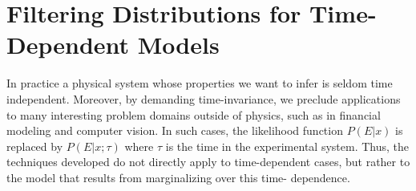 \documentclass[aps,amsmath,onecolumn,amssymb]{revtex4}
\begin{document}


\section{Filtering Distributions for Time-Dependent Models}
\label{sec:time-dep}

In practice a physical system whose properties we want to infer is seldom time
independent. Moreover, by demanding time-invariance, we preclude applications
to many interesting problem domains outside of physics, such as in financial
modeling and computer vision. In such cases, the likelihood function $P(E|x)$
is replaced by $P(E|x;\tau)$ where $\tau$ is the time in the experimental
system. Thus, the techniques developed do not directly apply to time-dependent
cases, but rather to the model that results from marginalizing over this time-
dependence.
\end{document}
